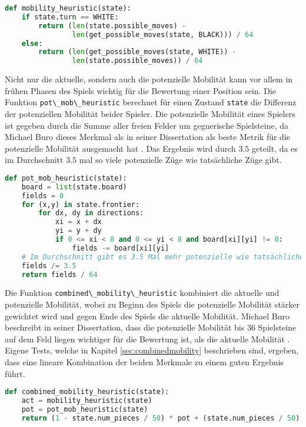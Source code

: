 \begin{lstlisting}[language=Python]
def mobility_heuristic(state):
    if state.turn == WHITE:
        return (len(state.possible_moves) -
                len(get_possible_moves(state, BLACK))) / 64
    else:
        return (len(get_possible_moves(state, WHITE)) -
                len(state.possible_moves)) / 64
\end{lstlisting}

Nicht nur die aktuelle, sondern auch die potenzielle Mobilität kann vor
allem in frühen Phasen des Spiels wichtig für die Bewertung einer
Position sein. Die Funktion
\passthrough{\lstinline!pot\_mob\_heuristic!} berechnet für einen
Zustand \passthrough{\lstinline!state!} die Differenz der potenziellen
Mobilität beider Spieler. Die potenzielle Mobilität eines Spielers ist
gegeben durch die Summe aller freien Felder um gegnerische Spielsteine,
da Michael Buro dieses Merkmal als in seiner Dissertation als beste
Metrik für die potenzielle Mobilität ausgemacht hat
\cite[S. 9]{evaluationfunctions}. Das Ergebnis wird durch \(3.5\)
geteilt, da es im Durchschnitt \(3.5\) mal so viele potenzielle Züge wie
tatsächliche Züge gibt.

\begin{lstlisting}[language=Python]
def pot_mob_heuristic(state):
    board = list(state.board)
    fields = 0
    for (x,y) in state.frontier:
        for dx, dy in directions:
            xi = x + dx
            yi = y + dy
            if 0 <= xi < 8 and 0 <= yi < 8 and board[xi][yi] != 0:
                fields -= board[xi][yi]
    # Im Durchschnitt gibt es 3.5 Mal mehr potenzielle wie tatsächliche Züge
    fields /= 3.5 
    return fields / 64
\end{lstlisting}

Die Funktion \passthrough{\lstinline!combined\_mobility\_heuristic!}
kombiniert die aktuelle und potenzielle Mobilität, wobei zu Beginn des
Spiels die potenzielle Mobilität stärker gewichtet wird und gegen Ende
des Spiels die aktuelle Mobilität. Michael Buro beschreibt in seiner
Dissertation, dass die potenzielle Mobilität bis 36 Spielsteine auf dem
Feld liegen wichtiger für die Bewertung ist, als die aktuelle Mobilität
\cite[S. 9]{evaluationfunctions}. Eigene Tests, welche in Kapitel
\ref{sec:combinedmobility} beschrieben sind, ergeben, dass eine lineare
Kombination der beiden Merkmale zu einem guten Ergebnis führt.

\begin{lstlisting}[language=Python]
def combined_mobility_heuristic(state):
    act = mobility_heuristic(state)
    pot = pot_mob_heuristic(state)
    return (1 - state.num_pieces / 50) * pot + (state.num_pieces / 50) *  act
\end{lstlisting}

